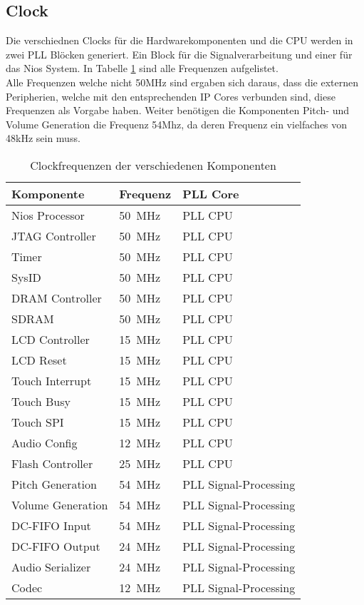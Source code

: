 \subsection{Clock}\label{subsec:Clock}
Die verschiednen Clocks für die Hardwarekomponenten und die CPU werden in zwei PLL Blöcken generiert. Ein Block für die Signalverarbeitung und einer für das Nios System. In Tabelle \ref{tab:clocks} sind alle Frequenzen aufgelistet. \\
Alle Frequenzen welche nicht 50MHz sind ergaben sich daraus, dass die externen Peripherien, welche mit den entsprechenden IP Cores verbunden sind, diese Frequenzen als Vorgabe haben. Weiter benötigen die Komponenten Pitch- und Volume Generation die Frequenz 54Mhz, da deren Frequenz ein vielfaches von 48kHz sein muss.

\begin{table}[H]
	\centering
	\caption{Clockfrequenzen der verschiedenen Komponenten}
	\label{tab:clocks}
	\begin{tabular}{l|l|l}
		\textbf{Komponente} & \textbf{Frequenz} & \textbf{PLL Core} \\
		\hline\hline
		Nios Processor & \SI{50}{MHz} & PLL CPU  \\ \hline
		JTAG Controller & \SI{50}{MHz} & PLL CPU \\ \hline
		Timer & \SI{50}{MHz} & PLL CPU \\ \hline
		SysID & \SI{50}{MHz} & PLL CPU \\ \hline
		DRAM Controller & \SI{50}{MHz} & PLL CPU \\ \hline
		SDRAM & \SI{50}{MHz} & PLL CPU \\ \hline
		LCD Controller & \SI{15}{MHz} & PLL CPU \\ \hline
		LCD Reset & \SI{15}{MHz} & PLL CPU \\ \hline
		Touch Interrupt & \SI{15}{MHz} & PLL CPU \\ \hline
		Touch Busy & \SI{15}{MHz} & PLL CPU \\ \hline
		Touch SPI & \SI{15}{MHz} & PLL CPU \\ \hline
		Audio Config & \SI{12}{MHz} & PLL CPU \\ \hline
		Flash Controller & \SI{25}{MHz} & PLL CPU \\ \hline
		Pitch Generation & \SI{54}{MHz} & PLL Signal-Processing \\ \hline
		Volume Generation & \SI{54}{MHz} & PLL Signal-Processing \\ \hline
		DC-FIFO Input	& \SI{54}{MHz} & PLL Signal-Processing \\ \hline
		DC-FIFO Output	& \SI{24}{MHz} & PLL Signal-Processing \\ \hline
	 	Audio Serializer	& \SI{24}{MHz} & PLL Signal-Processing \\ \hline
	 	Codec	& \SI{12}{MHz} & PLL Signal-Processing \\ \hline
		
	\end{tabular}
\end{table}
